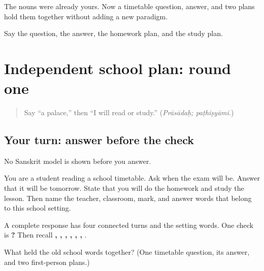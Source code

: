 \begin{grammarlens}[title={What you've built}]
The nouns were already yours. Now a timetable question, answer, and two plans hold them together without adding a new paradigm.
\end{grammarlens}

\begin{tcolorbox}[breakable,colback=teal!4,colframe=teal!35!black,title={Before you move on}]
Say the question, the answer, the homework plan, and the study plan.
\end{tcolorbox}
\section[(independent school plan, first round)]{Independent school plan: round one}

\label{lesson:SA-C267-mixed-school-practice}



\begin{quote}
Say “a palace,” then “I will read or study.” (\emph{Prāsādaḥ; paṭhiṣyāmi.})
\end{quote}

\subsection*{Your turn: answer before the check}
No Sanskrit model is shown before you answer.

You are a student reading a school timetable. Ask when the exam will be. Answer that it will be tomorrow. State that you will do the homework and study the lesson. Then name the teacher, classroom, mark, and answer words that belong to this school setting.

\begin{grammarlens}[title={What you've built: check after speaking}]
A complete response has four connected turns and the setting words. One check is \textbf{  ?       } Then recall \textbf{, , , , , , }.
\end{grammarlens}

\begin{tcolorbox}[breakable,colback=teal!4,colframe=teal!35!black,title={Before you move on}]
What held the old school words together? (One timetable question, its answer, and two first-person plans.)
\end{tcolorbox}
